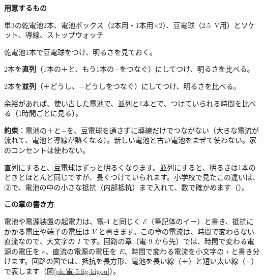 \begin{yattemiyou}
\textbf{用意するもの}\par
単3の乾電池2本、電池ボックス（2本用・1本用×2）、豆電球（\qty{2.5}{V}用）とソケット、導線、ストップウォッチ
\begin{enumerate}[label={\bkcircled[bkGreen]{\arabic*}}, leftmargin=2.4\zw, itemsep=1pt, topsep=2pt]
\item 乾電池1本で豆電球をつけ、明るさを見ておく。
\item 2本を\textbf{直列}（1本の＋と、もう1本の−をつなぐ）にしてつけ、明るさを比べる。
\item 2本を\textbf{並列}（＋どうし、−どうしをつなぐ）にしてつけ、明るさを比べる。
\item 余裕があれば、使い古した電池で、並列と1本とで、つけていられる時間を比べる（1時間ごとに見る）。
\end{enumerate}
\textbf{約束}：電池の＋と−を、豆電球を通さずに導線だけでつながない（大きな電流が流れて、電池と導線が熱くなる）。新しい電池と古い電池をまぜて使わない。家のコンセントは使わない。
\end{yattemiyou}

\noindent 直列にすると、豆電球はずっと明るくなります。並列にすると、明るさは1本のときとほとんど同じですが、長くつけていられます。小学校で見たこの違いは、②で、電池の中の小さな抵抗（内部抵抗）まで入れて、数で確かめます（）。

\begin{omoidasou}
\end{omoidasou}

\noindent\textbf{この章の書き方}\par\nobreak
電池や電源装置の起電力は、電-4 と同じく $\mathcal E$（筆記体のイー）と書き、抵抗にかかる電圧や端子の電圧は $V$ と書きます。この章の電流は、時間で変わらない直流なので、大文字の $I$ です。回路の章（電-9 から先）では、時間で変わる電源の電圧を $e$、直流の電源の電圧を $E$、時間で変わる電流を小文字の $i$ と書き分けます。回路の図では、抵抗を長方形、電池を長い線（＋）と短い太い線（−）で表します（図\ref{ph:電-5:fig-kigou}）。

